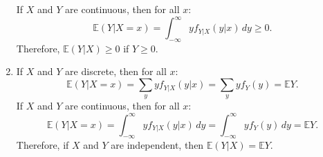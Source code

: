 \documentclass{huhtakm-template-book-v2}
\newcommand{\expect}{\mathbb{E}}
\begin{document}
\begin{proofing}
\begin{enumerate}
\begin{equation*}
            \end{equation*}
            If $X$ and $Y$ are continuous, then for all $x$:
            \begin{equation*}
                \expect(Y|X = x) = \int_{-\infty}^{\infty} yf_{Y|X}(y|x)\,dy \geq 0.
            \end{equation*}
            Therefore, $\expect(Y|X) \geq 0$ if $Y \geq 0$.
            \item If $X$ and $Y$ are discrete, then for all $x$:
            \begin{equation*}
                \expect(Y|X = x) = \sum_{y}yf_{Y|X}(y|x) = \sum_{y}yf_{Y}(y) = \expect{Y}.
            \end{equation*}
            If $X$ and $Y$ are continuous, then for all $x$:
            \begin{equation*}
                \expect(Y|X = x) = \int_{-\infty}^{\infty} yf_{Y|X}(y|x)\,dy = \int_{-\infty}^{\infty} yf_{Y}(y)\,dy = \expect{Y}.
            \end{equation*}
            Therefore, if $X$ and $Y$ are independent, then $\expect(Y|X) = \expect{Y}$.
        \end{enumerate}
    \end{proofing}
    \newpage
\end{document}
